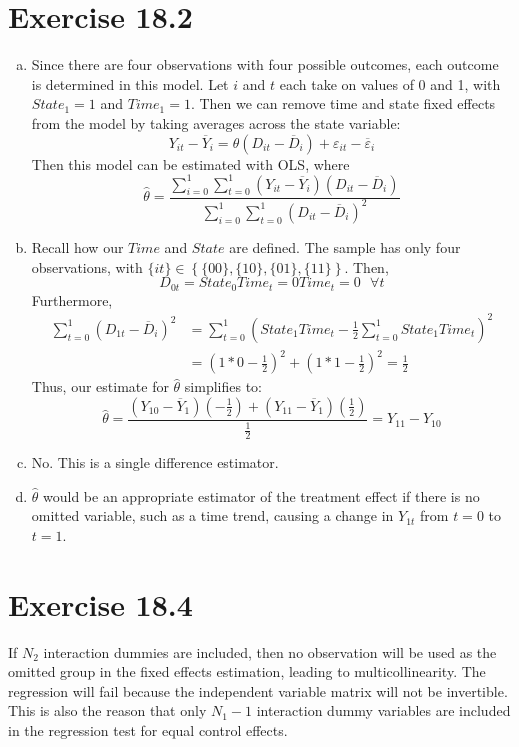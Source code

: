 \documentclass{article}
\newcommand{\ybar}{\overline{Y}}
\newcommand{\eps}{\varepsilon}
\begin{document}
\section*{Exercise 18.2}
\begin{enumerate}[(a)]

	\item Since there are four observations with four possible outcomes, each outcome is determined in this model. Let $i$ and $t$ each take on values of 0 and 1, with ${State_1=1}$ and ${Time_1=1}$. Then we can remove time and state fixed effects from the model by taking averages across the state variable:
		\[
			Y_{it}-\ybar_i = \theta(D_{it} - \overline{D}_i) + \eps_{it} - \overline{\varepsilon}_i
		\]
		Then this model can be estimated with OLS, where
		\[
			\hat{\theta} = \frac{\sum_{i=0}^1\sum_{t=0}^1(Y_{it}-\ybar_i)(D_{it}-\overline{D}_i)}{\sum_{i=0}^1\sum_{t=0}^1(D_{it}-\overline{D}_i)^2}
		\]
		
	\item Recall how our $Time$ and $State$ are defined. The sample has only four observations, with ${\{it\}\in\left\{\{00\},\{10\},\{01\},\{11\}\right\}}$. Then,
		\[
			D_{0t} = State_0Time_t = 0Time_t = 0 \text{ }\forall t
		\]
		Furthermore,
		\begin{align*}
			\sum_{t=0}^1(D_{1t}-\overline{D}_i)^2 	&= \sum_{t=0}^1 \left(State_1Time_t - \frac{1}{2}\sum_{t=0}^1State_1Time_t\right)^2 	\\
													&= \left(1*0 - \frac{1}{2}\right)^2 + \left(1*1 - \frac{1}{2}\right)^2 = \frac{1}{2}
		\end{align*}
		Thus, our estimate for $\hat{\theta}$ simplifies to:
		\[
			\hat{\theta} = \frac{(Y_{10}-\ybar_1)\left(-\frac{1}{2}\right) + (Y_{11}-\ybar_1)\left(\frac{1}{2}\right)}{\frac{1}{2}} = Y_{11}-Y_{10}
		\]
		
	\item No. This is a single difference estimator.
	
	\item $\hat{\theta}$ would be an appropriate estimator of the treatment effect if there is no omitted variable, such as a time trend, causing a change in $Y_{1t}$ from ${t=0}$ to ${t=1}$.
		
	
\end{enumerate}


\section*{Exercise 18.4}
If $N_2$ interaction dummies are included, then no observation will be used as the omitted group in the fixed effects estimation, leading to multicollinearity. The regression will fail because the independent variable matrix will not be invertible. This is also the reason that only $N_1-1$ interaction dummy variables are included in the regression test for equal control effects.
\end{document}
